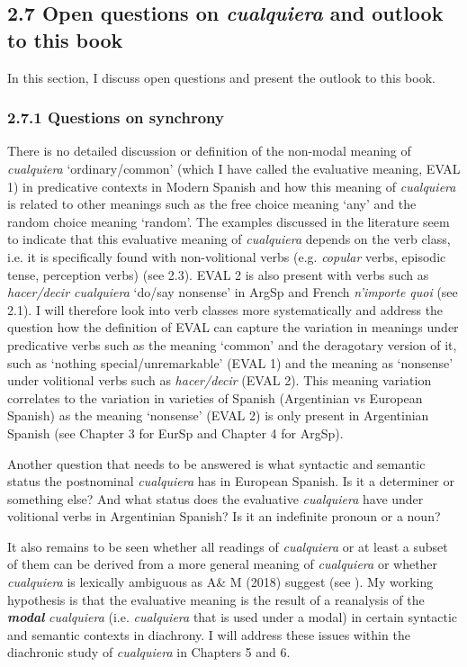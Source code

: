 \documentclass[output=paper]{langscibook}
\begin{document}
\subsection{\textbf{2.7} \textbf{Open} \textbf{questions} \textbf{on} \textbf{\textit{cualquiera}}\textbf{ }\textbf{and} \textbf{outlook} \textbf{to} \textbf{this} \textbf{book}}

 In this section, I discuss open questions and present the outlook to this book.

\subsubsection{\textbf{2.7.1} \textbf{Questions} \textbf{on} \textbf{synchrony}}

There is no detailed discussion or definition of the non-modal meaning of \textit{cualquiera} ‘ordinary/common’ (which I have called the evaluative meaning, EVAL 1) in predicative contexts in Modern Spanish and how this meaning of \textit{cualquiera} is related to other meanings such as the free choice meaning ‘any’ and the random choice meaning ‘random’. The examples discussed in the literature seem to indicate that this evaluative meaning of \textit{cualquiera} depends on the verb class, i.e. it is specifically found with non-volitional verbs (e.g. \textit{copular} verbs, episodic tense, perception verbs) (see 2.3). EVAL 2 is also present with verbs such as \textit{hacer/decir cualquiera} ‘do/say nonsense’ in ArgSp and French \textit{n’importe quoi} (see 2.1). I will therefore look into verb classes more systematically and address the question how the definition of EVAL can capture the variation in meanings under predicative verbs such as the meaning ‘common’ and the deragotary version of it, such as ‘nothing special/unremarkable’ (EVAL 1) and the meaning as ‘nonsense’ under volitional verbs such as \textit{hacer/decir} (EVAL 2). This meaning variation correlates to the variation in varieties of Spanish (Argentinian vs European Spanish) as the meaning ‘nonsense’ (EVAL 2) is only present in Argentinian Spanish (see Chapter 3 for EurSp and Chapter 4 for ArgSp). 

  Another question that needs to be answered is what syntactic and semantic status the postnominal \textit{cualquiera} has in European Spanish. Is it a determiner or something else? And what status does the evaluative \textit{cualquiera} have under volitional verbs in Argentinian Spanish? Is it an indefinite pronoun or a noun?

  It also remains to be seen whether all readings of \textit{cualquiera} or at least a subset of them can be derived from a more general meaning of \textit{cualquiera} or whether \textit{cualquiera} is lexically ambiguous as A\& M (2018) suggest (see ). My working hypothesis is that the evaluative meaning is the result of a reanalysis of the \textbf{\textit{modal}} \textit{cualquiera} (i.e. \textit{cualquiera} that is used under a modal) in certain syntactic and semantic contexts in diachrony. I will address these issues within the diachronic study of \textit{cualquiera} in Chapters 5 and 6.
\end{document}
